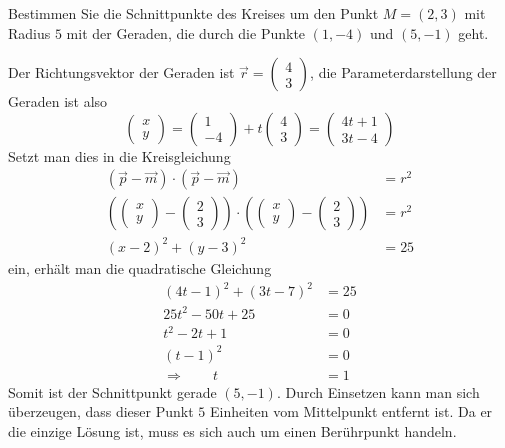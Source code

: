 Bestimmen Sie die Schnittpunkte des Kreises um den Punkt $M=(2,3)$
mit Radius $5$ mit der Geraden, die durch die Punkte $(1,-4)$
und $(5,-1)$ geht.

\begin{loesung}
Der Richtungsvektor der Geraden ist $\vec r=\begin{pmatrix}4\\3\end{pmatrix}$,
die Parameterdarstellung der Geraden ist also
\[
\begin{pmatrix}x\\y\end{pmatrix}
=
\begin{pmatrix}1\\-4\end{pmatrix}
+t
\begin{pmatrix}4\\3\end{pmatrix}
=
\begin{pmatrix}4t+1\\3t-4\end{pmatrix}
\]
Setzt man dies in die Kreisgleichung
\begin{align*}
(\vec p-\vec m)\cdot(\vec p-\vec m)&=r^2\\
\left(
\begin{pmatrix}x\\y\end{pmatrix}
-
\begin{pmatrix}2\\3\end{pmatrix}
\right)
\cdot
\left(
\begin{pmatrix}x\\y\end{pmatrix}
-
\begin{pmatrix}2\\3\end{pmatrix}
\right)
&=r^2
\\
(x-2)^2+(y-3)^2&=25
\end{align*}
ein, erhält man die quadratische Gleichung
\begin{align*}
(4t-1)^2+(3t-7)^2&=25
\\
25t^2-50t+25&=0
\\
t^2-2t+1&=0
\\
(t-1)^2&=0
\\
\Rightarrow\qquad t&=1
\end{align*}
Somit ist der Schnittpunkt gerade $(5,-1)$. Durch Einsetzen kann
man sich überzeugen, dass dieser Punkt $5$ Einheiten vom Mittelpunkt
entfernt ist. Da er die einzige Lösung ist, muss es sich auch um
einen Berührpunkt handeln.
\end{loesung}

